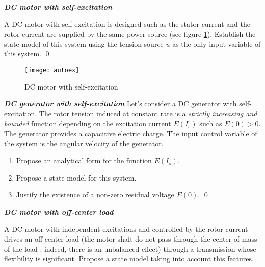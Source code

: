 \begin{exercice}{\bf \em DC motor with self-excitation}

A DC motor with self-excitation is designed such as the stator 
current and the rotor current are supplied by the same power source
(see figure \ref{fig:autoex}). Establish the state model
of this system using the tension source $u$ as the only input 
variable of this system. \qed
\begin{figure}[htbp]
\begin{center}
\texttt{[image: autoex]}
\caption{DC motor with self-excitation}
\label{fig:autoex}
\end{center}
\end{figure}
\end{exercice}
\vv

\begin{exercice}{\bf \em DC generator with self-excitation}
Let's consider a DC generator with self-excitation. The rotor tension 
induced at constant rate is a {\em strictly increasing and bounded} function 
depending on the excitation current $E(I_s)$ such as $E(0) >
0$. The generator provides a capacitive electric charge. 
The input control variable of the system is the angular velocity of 
the generator. 
\begin{enumerate}
\item Propose an analytical form for the function $E(I_s)$.
\item Propose a state model for this system.
\item Justify the existence of a non-zero residual voltage $E(0)$. \qed
\end{enumerate}
\end{exercice}
\vv

\begin{exercice}{\bf \em DC motor with off-center load}

A DC motor with independent excitations and controlled by the rotor current
drives an off-center load (the motor shaft do not pass through the 
center of mass of the load : indeed, there is an unbalanced effect)
through a transmission whose flexibility is significant. 
Propose a state model taking into account this features. 
\end{exercice}
\vv

